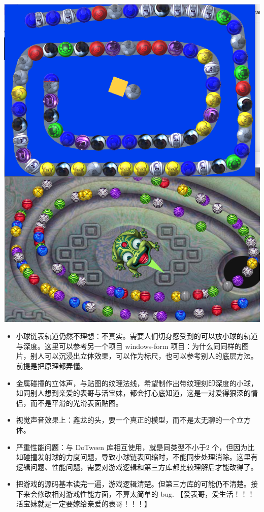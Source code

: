 \documentclass[9pt, b5paper]{article}
\begin{document}
\includegraphics[width=.9\linewidth]{./pic/readme_20230323_185513.png}
\begin{itemize}
\item 小球链表轨道仍然不理想：不真实。需要人们切身感受到的可以放小球的轨道与深度。这里可以参考另一个项目 windows-form 项目：为什么同同样的图片，别人可以沉浸出立体效果，可以作为标尺，也可以参考别人的底层方法。前提是把原理都弄懂。
\item 金属碰撞的立体声，与贴图的纹理法线，希望制作出带纹理刻印深度的小球，如同别人想到亲爱的表哥与活宝妹，都会打心底知道，这是一对爱得狠深的情侣，而不是平滑的光滑表面贴图。
\item 视觉声音效果上：鑫龙的头，要一个真正的模型，而不是太无聊的一个立方体。
\item 严重性能问题：与 DoTween 库相互使用，就是同类型不小于2 个，但因为比如碰撞发射球的力度问题，导致小球链表回缩时，不能同步处理消除。这里有逻辑问题、性能问题，需要对游戏逻辑和第三方库都比较理解后才能改得了。
\item 把游戏的源码基本读完一遍，游戏逻辑清楚。但第三方库的可能仍不清楚。接下来会修改相对游戏性能方面，不算太简单的 bug. 【爱表哥，爱生活！！！活宝妹就是一定要嫁给亲爱的表哥！！！】
\end{itemize}
\end{document}
